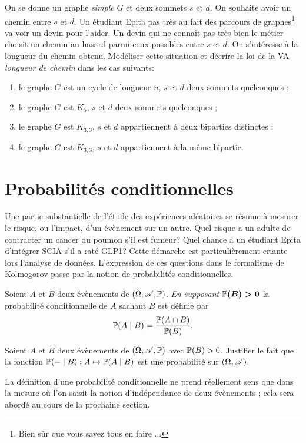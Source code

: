 \documentclass[11pt, a4paper]{article}
\begin{document}
\begin{question}
  On se donne un graphe \textit{simple} $G$ et deux sommets $s$ et
  $d$. On souhaite avoir un chemin entre $s$ et $d$. Un étudiant Epita
  pas très au fait des parcours de graphes\footnote{Bien sûr que vous
    savez tous en faire ...} va voir un devin pour l'aider. Un devin
  qui ne connaît pas très bien le métier choisit un chemin au hasard
  parmi ceux possibles entre $s$ et $d$. On s'intéresse à la longueur
  du chemin obtenu. Modéliser cette situation et décrire la loi de la
  VA \textit{longueur de chemin} dans les cas suivants:
  \begin{enumerate}
  \item le graphe $G$ est un cycle de longueur $n$, $s$ et $d$ deux
    sommets quelconques ;
  \item le graphe $G$ est $K_5$, $s$ et $d$ deux sommets quelconques ;
  \item le graphe $G$ est $K_{3, 3}$, $s$ et $d$ appartiennent à deux
    biparties distinctes ;
  \item le graphe $G$ est $K_{3, 3}$, $s$ et $d$ appartiennent à la
    même bipartie.
  \end{enumerate}
\end{question}

\section{Probabilités conditionnelles}
\label{sec:probabilitesConditionnelles}

Une partie substantielle de l'étude des expériences aléatoires se
résume à mesurer le risque, ou l'impact, d'un évènement sur un
autre. Quel risque a un adulte de contracter un cancer du poumon s'il
est fumeur? Quel chance a un étudiant Epita d'intégrer SCIA s'il a
raté GLP1? Cette démarche est particulièrement criante lors l'analyse
de données. L'expression de ces questions dans le formalisme de
Kolmogorov passe par la notion de probabilités conditionnelles.
\begin{defn}
  Soient $A$ et $B$ deux évènements de $(\Omega, \mathscr{A},
  \operatorname{\mathbb{P}})$. \emph{En supposant $\boldsymbol{\operatorname{\mathbb{P}}(B) > 0}$} la probabilité
  conditionnelle de $A$ sachant $B$ est définie par
  \[
    \operatorname{\mathbb{P}}(A\mid B) = \frac{\operatorname{\mathbb{P}}(A\cap B)}{\operatorname{\mathbb{P}}(B)}.
  \]
\end{defn}
\begin{question}
  Soient $A$ et $B$ deux évènements de $(\Omega, \mathscr{A}, \operatorname{\mathbb{P}})$ avec
  $\operatorname{\mathbb{P}}(B) > 0$. Justifier le fait que la fonction
  $\operatorname{\mathbb{P}}( - \mid B) : A \mapsto \operatorname{\mathbb{P}}(A \mid B)$ est une probabilité
  sur $(\Omega, \mathscr{A})$.
\end{question}
La définition d'une probabilité conditionnelle ne prend réellement
sens que dans la mesure où l'on saisit la notion d'indépendance de
deux évènements ; cela sera abordé au cours de la prochaine section.
\end{document}
